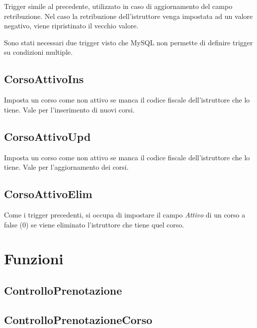 Trigger simile al precedente, utilizzato in caso di aggiornamento del campo retribuzione. Nel caso la retribuzione dell'istruttore venga impostata ad un valore negativo, viene ripristinato il vecchio valore.

Sono stati necessari due trigger visto che MySQL non permette di definire trigger su condizioni multiple.

\subsection{CorsoAttivoIns}


Imposta un corso come non attivo se manca il codice fiscale dell'istruttore che lo tiene. Vale per l'inserimento di nuovi corsi.

\subsection{CorsoAttivoUpd}



Imposta un corso come non attivo se manca il codice fiscale dell'istruttore che lo tiene. Vale per l'aggiornamento dei corsi.

\subsection{CorsoAttivoElim}



Come i trigger precedenti, si occupa di impostare il campo \textit{Attivo} di un corso a false (0) se viene eliminato l'istruttore che tiene quel corso.

\section{Funzioni}

\subsection{ControlloPrenotazione}



\subsection{ControlloPrenotazioneCorso}

